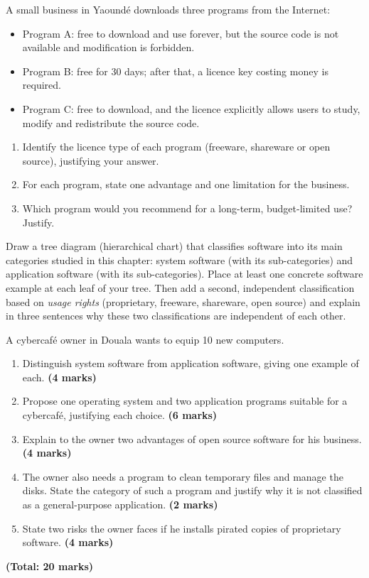 \documentclass[11pt]{article}
\newcounter{popsec}
\newcounter{popsub}
\newcommand{\courssub}[1]{%
  \stepcounter{popsub}%
  \par\vspace{9pt}\noindent{\popxbold\fontsize{11.5}{13}\selectfont\color{popink}{\color{poporange}\thepopsec.\thepopsub}\hspace{6pt}#1}\par\nopagebreak\vspace{4pt}
}
\begin{document}
\begin{exercice}
A small business in Yaoundé downloads three programs from the Internet:
\begin{itemize}
\item Program A: free to download and use forever, but the source code is not available and modification is forbidden.
\item Program B: free for 30 days; after that, a licence key costing money is required.
\item Program C: free to download, and the licence explicitly allows users to study, modify and redistribute the source code.
\end{itemize}
\begin{enumerate}
\item Identify the licence type of each program (freeware, shareware or open source), justifying your answer.
\item For each program, state one advantage and one limitation for the business.
\item Which program would you recommend for a long-term, budget-limited use? Justify.
\end{enumerate}
\end{exercice}

\begin{exercice}
Draw a tree diagram (hierarchical chart) that classifies software into its main categories studied in this chapter: system software (with its sub-categories) and application software (with its sub-categories). Place at least one concrete software example at each leaf of your tree. Then add a second, independent classification based on \emph{usage rights} (proprietary, freeware, shareware, open source) and explain in three sentences why these two classifications are independent of each other.
\end{exercice}

\courssub{I prepare for the GCE}

\begin{exercice}
A cybercafé owner in Douala wants to equip 10 new computers.
\begin{enumerate}
\item Distinguish system software from application software, giving one example of each. \textbf{(4 marks)}
\item Propose one operating system and two application programs suitable for a cybercafé, justifying each choice. \textbf{(6 marks)}
\item Explain to the owner two advantages of open source software for his business. \textbf{(4 marks)}
\item The owner also needs a program to clean temporary files and manage the disks. State the category of such a program and justify why it is not classified as a general-purpose application. \textbf{(2 marks)}
\item State two risks the owner faces if he installs pirated copies of proprietary software. \textbf{(4 marks)}
\end{enumerate}
\textbf{(Total: 20 marks)}
\end{exercice}
\end{document}

